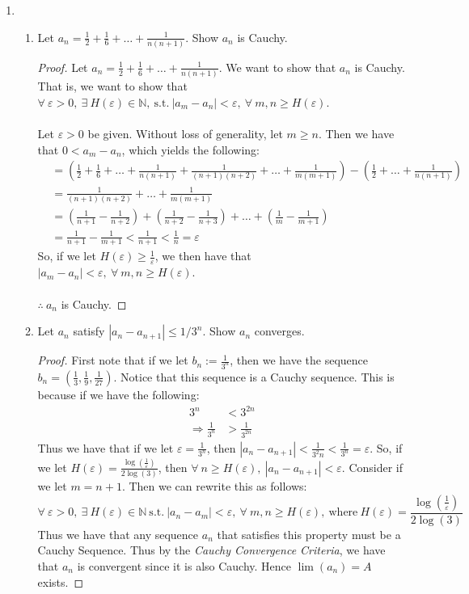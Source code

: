 \documentclass[12pt,letterpaper]{article}
\newcommand{\st}{\ \text{s.t.}\ }
\newcommand{\N}{\mathbb{N}}
\theoremstyle{case}
\theoremstyle{definition}
\begin{document}
\begin{enumerate}
		\item
		\begin{enumerate}
			\item Let $a_n=\frac{1}{2}+\frac{1}{6}+ \dots + \frac{1}{n(n+1)}$. Show $a_n$ is Cauchy.
			\begin{proof}
				Let $a_n=\frac{1}{2}+\frac{1}{6}+ \dots + \frac{1}{n(n+1)}$. We want to show that $a_n$ is Cauchy. That is, we want to show that $\forall\ \varepsilon>0,\ \exists\ H(\varepsilon) \in \N, \st |a_m-a_n|<\varepsilon,\ \forall\ m,n\geq H(\varepsilon)$.
				\\\\Let $\varepsilon >0$ be given. Without loss of generality, let $m \geq n$. Then we have that $0<a_m-a_n$, which yields the following:
				\begin{align*}
					&= \left(\frac{1}{2}+\frac{1}{6}+ \dots + \frac{1}{n(n+1)}+\frac{1}{(n+1)(n+2)}+ \dots + \frac{1}{m(m+1)}\right) - \left(\frac{1}{2} + \dots + \frac{1}{n(n+1)}\right) \\
					&= \frac{1}{(n+1)(n+2)}+ \dots + \frac{1}{m(m+1)} \\
					&= \left(\frac{1}{n+1}-\frac{1}{n+2}\right)+ \left(\frac{1}{n+2}-\frac{1}{n+3}\right) + \dots + \left(\frac{1}{m}-\frac{1}{m+1}\right) \\
					&= \frac{1}{n+1}-\frac{1}{m+1} < \frac{1}{n+1} < \frac{1}{n}=\varepsilon
				\end{align*}
				So, if we let $H(\varepsilon)\geq \frac{1}{\varepsilon}$, we then have that $|a_m-a_n|<\varepsilon,\ \forall\ m,n\geq H(\varepsilon)$.
				\\\\$\therefore\ a_n$ is Cauchy.
			\end{proof}
			
			\item Let $a_n$ satisfy $|a_n-a_{n+1}| \leq 1/3^n$. Show $a_n$ converges.
			\begin{proof}
				First note that if we let $b_n:=\frac{1}{3^n}$, then we have the sequence $b_n=(\frac{1}{3}, \frac{1}{9}, \frac{1}{27})$. Notice that this sequence is a Cauchy sequence. This is because if we have the following:
				\begin{align*}
					3^n &< 3^{2n} \\
					\Rightarrow \frac{1}{3^n} &> \frac{1}{3^{2n}}
				\end{align*}
				Thus we have that if we let $\varepsilon = \frac{1}{3^n}$, then $|a_n-a_{n+1}|<\frac{1}{3^2n}<\frac{1}{3^n}=\varepsilon$. So, if we let $H(\varepsilon)=\frac{\log (\frac{1}{\varepsilon})}{2 \log (3)}$, then $\forall\ n \geq H(\varepsilon),\ |a_n-a_{n+1}|<\varepsilon$. Consider if we let $m=n+1$. Then we can rewrite this as follows:
				\[\forall\ \varepsilon>0,\ \exists\ H(\varepsilon) \in \N \st |a_n-a_m|<\varepsilon,\ \forall\ m,n \geq H(\varepsilon),\ \text{where}\ H(\varepsilon)=\frac{\log (\frac{1}{\varepsilon})}{2 \log (3)}\]
				Thus we have that any sequence $a_n$ that satisfies this property must be a Cauchy Sequence. Thus by the \textit{Cauchy Convergence Criteria}, we have that $a_n$ is convergent since it is also Cauchy. Hence $\lim (a_n) = A$ exists.
			\end{proof}
			

\end{enumerate}
\end{enumerate}
\end{document}
